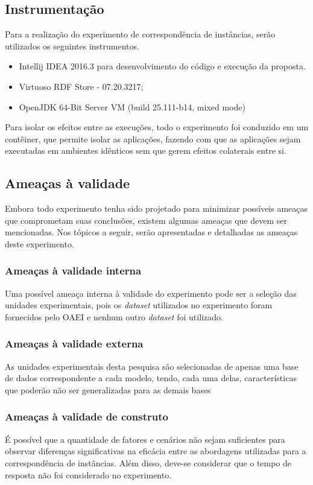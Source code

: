 \subsection{Instrumentação}
Para a realização do experimento de correspondência de instâncias, serão utilizados os seguintes instrumentos.

\begin{itemize}
\item Intellij IDEA 2016.3 para desenvolvimento do código e execução da proposta.
\item Virtuoso RDF Store - 07.20.3217;
\item OpenJDK 64-Bit Server VM (build 25.111-b14, mixed mode)
\end{itemize}

Para isolar os efeitos entre as execuções, todo o experimento foi conduzido em um contêiner, que permite isolar as aplicações, fazendo com que as aplicações sejam executadas em ambientes idênticos sem que gerem efeitos colaterais entre si.

\subsection{Ameaças à validade}
Embora todo experimento tenha sido projetado para minimizar possíveis ameaças que comprometam suas conclusões, existem algumas ameaças que devem ser mencionadas. Nos tópicos a seguir, serão apresentadas e detalhadas as ameaças deste experimento.

\subsubsection{Ameaças à validade interna}
Uma possível ameaça interna à validade do experimento pode ser a seleção das unidades experimentais, pois os \textit{dataset} utilizados no experimento foram fornecidos pelo OAEI e nenhum outro \textit{dataset} foi utilizado.

\subsubsection{Ameaças à validade externa}
As unidades experimentais desta pesquisa são selecionadas de apenas uma base de dados correspondente a cada modelo, tendo, cada uma delas, características que poderão não ser generalizadas para as demais bases

\subsubsection{Ameaças à validade de construto}
É possível que a quantidade de fatores e cenários não sejam suficientes para observar diferenças significativas na eficácia entre as abordagens utilizadas para a correspondência de instâncias. Além disso, deve-se considerar que o tempo de resposta não foi considerado no experimento.

